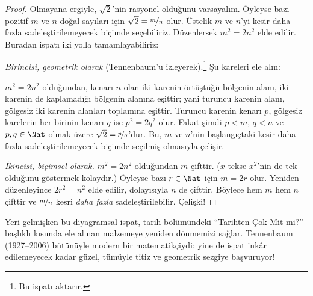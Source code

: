 \begin{proof}
Olmayana ergiyle, $\sqrt{2}$'nin rasyonel olduğunu varsayalım. Öyleyse bazı
pozitif $m$ ve $n$ doğal sayıları için $\sqrt{2} = \nicefrac{m}{n}$ olur.
Üstelik $m$ ve $n$'yi kesir daha fazla sadeleştirilemeyecek biçimde
seçebiliriz.
Düzenlersek $m^{2} = 2n^{2}$ elde edilir. Buradan ispatı iki yolla
tamamlayabiliriz:

\emph{Birincisi, geometrik olarak} (Tennenbaum'u izleyerek).\footnote{Bu ispatı
\cite{Conway2006} aktarır.} Şu kareleri ele alın:
\begin{center}	
\end{center}
$m^2 = 2n^2$ olduğundan, kenarı $n$ olan iki karenin örtüştüğü bölgenin
alanı, iki karenin de kaplamadığı bölgenin alanına eşittir; yani turuncu
karenin alanı, gölgesiz iki karenin alanları toplamına eşittir. Turuncu
karenin kenarı $p$, gölgesiz karelerin her birinin kenarı $q$ ise
$p^2 = 2q^2$ olur. Fakat şimdi $p < m$, $q < n$ ve $p, q \in \Nat$ olmak
üzere $\sqrt{2} = \nicefrac{p}{q}$'dur. Bu, $m$ ve $n$'nin başlangıçtaki
kesir daha fazla sadeleştirilemeyecek biçimde seçilmiş olmasıyla çelişir.
		
\emph{İkincisi, biçimsel olarak.} $m^{2} = 2n^{2}$ olduğundan $m$ çifttir.
($x$ tekse $x^2$'nin de tek olduğunu göstermek kolaydır.) Öyleyse bazı
$r \in \Nat$ için $m = 2r$ olur. Yeniden düzenleyince $2r^2 = n^2$ elde
edilir,
dolayısıyla $n$ de çifttir. Böylece hem $m$ hem $n$ çifttir ve
$\nicefrac{m}{n}$ kesri \emph{daha fazla} sadeleştirilebilir. Çelişki!
\end{proof}

Yeri gelmişken bu diyagramsal ispat, tarih bölümündeki “Tarihten Çok Mit mi?”
başlıklı kısımda ele alınan malzemeye yeniden dönmemizi sağlar. Tennenbaum
(1927--2006) bütünüyle modern
bir matematikçiydi; yine de ispat inkâr edilemeyecek kadar güzel, tümüyle
titiz ve geometrik sezgiye başvuruyor!


